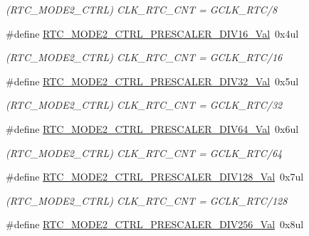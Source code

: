 \begin{DoxyCompactItemize}
\begin{DoxyCompactList}\small\item\em (R\+T\+C\+\_\+\+M\+O\+D\+E2\+\_\+\+C\+T\+RL) C\+L\+K\+\_\+\+R\+T\+C\+\_\+\+C\+NT = G\+C\+L\+K\+\_\+\+R\+T\+C/8 \end{DoxyCompactList}\item 
\#define \mbox{\hyperlink{group___s_a_m_d21___r_t_c_gafefb030f91512818ec899fe7c2b9d052}{R\+T\+C\+\_\+\+M\+O\+D\+E2\+\_\+\+C\+T\+R\+L\+\_\+\+P\+R\+E\+S\+C\+A\+L\+E\+R\+\_\+\+D\+I\+V16\+\_\+\+Val}}~0x4ul
\begin{DoxyCompactList}\small\item\em (R\+T\+C\+\_\+\+M\+O\+D\+E2\+\_\+\+C\+T\+RL) C\+L\+K\+\_\+\+R\+T\+C\+\_\+\+C\+NT = G\+C\+L\+K\+\_\+\+R\+T\+C/16 \end{DoxyCompactList}\item 
\#define \mbox{\hyperlink{group___s_a_m_d21___r_t_c_gaa7ca6312e1627a6a75b67945c657fa8f}{R\+T\+C\+\_\+\+M\+O\+D\+E2\+\_\+\+C\+T\+R\+L\+\_\+\+P\+R\+E\+S\+C\+A\+L\+E\+R\+\_\+\+D\+I\+V32\+\_\+\+Val}}~0x5ul
\begin{DoxyCompactList}\small\item\em (R\+T\+C\+\_\+\+M\+O\+D\+E2\+\_\+\+C\+T\+RL) C\+L\+K\+\_\+\+R\+T\+C\+\_\+\+C\+NT = G\+C\+L\+K\+\_\+\+R\+T\+C/32 \end{DoxyCompactList}\item 
\#define \mbox{\hyperlink{group___s_a_m_d21___r_t_c_ga7637ad5ae340daefc0484f2e098049ca}{R\+T\+C\+\_\+\+M\+O\+D\+E2\+\_\+\+C\+T\+R\+L\+\_\+\+P\+R\+E\+S\+C\+A\+L\+E\+R\+\_\+\+D\+I\+V64\+\_\+\+Val}}~0x6ul
\begin{DoxyCompactList}\small\item\em (R\+T\+C\+\_\+\+M\+O\+D\+E2\+\_\+\+C\+T\+RL) C\+L\+K\+\_\+\+R\+T\+C\+\_\+\+C\+NT = G\+C\+L\+K\+\_\+\+R\+T\+C/64 \end{DoxyCompactList}\item 
\#define \mbox{\hyperlink{group___s_a_m_d21___r_t_c_ga3721f13d53674d1345a819e81217062d}{R\+T\+C\+\_\+\+M\+O\+D\+E2\+\_\+\+C\+T\+R\+L\+\_\+\+P\+R\+E\+S\+C\+A\+L\+E\+R\+\_\+\+D\+I\+V128\+\_\+\+Val}}~0x7ul
\begin{DoxyCompactList}\small\item\em (R\+T\+C\+\_\+\+M\+O\+D\+E2\+\_\+\+C\+T\+RL) C\+L\+K\+\_\+\+R\+T\+C\+\_\+\+C\+NT = G\+C\+L\+K\+\_\+\+R\+T\+C/128 \end{DoxyCompactList}\item 
\#define \mbox{\hyperlink{group___s_a_m_d21___r_t_c_gaebb60e0a15f5659261bfe194201b5186}{R\+T\+C\+\_\+\+M\+O\+D\+E2\+\_\+\+C\+T\+R\+L\+\_\+\+P\+R\+E\+S\+C\+A\+L\+E\+R\+\_\+\+D\+I\+V256\+\_\+\+Val}}~0x8ul

\end{DoxyCompactItemize}
